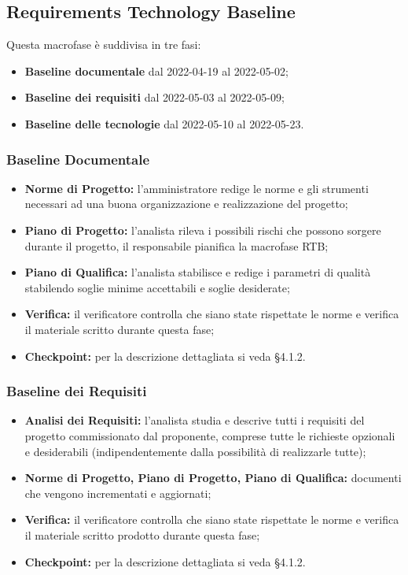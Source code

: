 \subsection{Requirements Technology Baseline}
Questa macrofase è suddivisa in tre fasi:
\begin{itemize}
    \item \textbf{Baseline documentale} dal 2022-04-19 al 2022-05-02;
    \item \textbf{Baseline dei requisiti} dal 2022-05-03 al 2022-05-09;
    \item \textbf{Baseline delle tecnologie} dal 2022-05-10 al 2022-05-23.
\end{itemize}

\subsubsection{Baseline Documentale}
\begin{itemize}
    \item \textbf{Norme di Progetto:} l'amministratore redige le norme e gli strumenti necessari ad una buona organizzazione e realizzazione del progetto;
    \item \textbf{Piano di Progetto:} l'analista rileva i possibili rischi che possono sorgere durante il progetto, il responsabile pianifica la macrofase RTB;
    \item \textbf{Piano di Qualifica:} l'analista stabilisce e redige i parametri di qualità stabilendo soglie minime accettabili e soglie desiderate; 
    \item \textbf{Verifica:} il verificatore controlla che siano state rispettate le norme e verifica il materiale scritto durante questa fase;
    \item \textbf{Checkpoint:} per la descrizione dettagliata si veda §4.1.2. 
\end{itemize}

\subsubsection{Baseline dei Requisiti}
\begin{itemize}
    \item \textbf{Analisi dei Requisiti:} l'analista studia e descrive tutti i requisiti del progetto commissionato dal proponente, 
                comprese tutte le richieste opzionali e desiderabili (indipendentemente dalla possibilità di realizzarle tutte);
    \item \textbf{Norme di Progetto, Piano di Progetto, Piano di Qualifica:} documenti che vengono incrementati e aggiornati;
    \item \textbf{Verifica:} il verificatore controlla che siano state rispettate le norme e verifica il materiale scritto prodotto durante questa fase;
    \item \textbf{Checkpoint:} per la descrizione dettagliata si veda §4.1.2.
\end{itemize}

